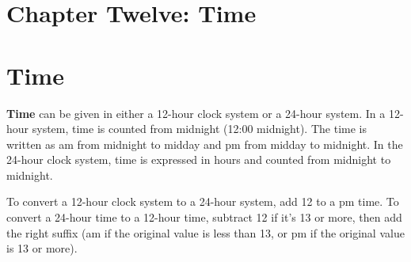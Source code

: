 \documentclass[
  a4paperpaper,
]{scrbook}
\begin{document}

\chapter{Chapter Twelve: Time}\label{chapter-twelve-time}


\chapter*{Time}\label{time}


\textbf{Time} can be given in either a 12-hour clock system or a 24-hour
system. In a 12-hour system, time is counted from midnight (12:00
midnight). The time is written as am from midnight to midday and pm from
midday to midnight. In the 24-hour clock system, time is expressed in
hours and counted from midnight to midnight.

To convert a 12-hour clock system to a 24-hour system, add 12 to a pm
time. To convert a 24-hour time to a 12-hour time, subtract 12 if it's
13 or more, then add the right suffix (am if the original value is less
than 13, or pm if the original value is 13 or more).
\end{document}
